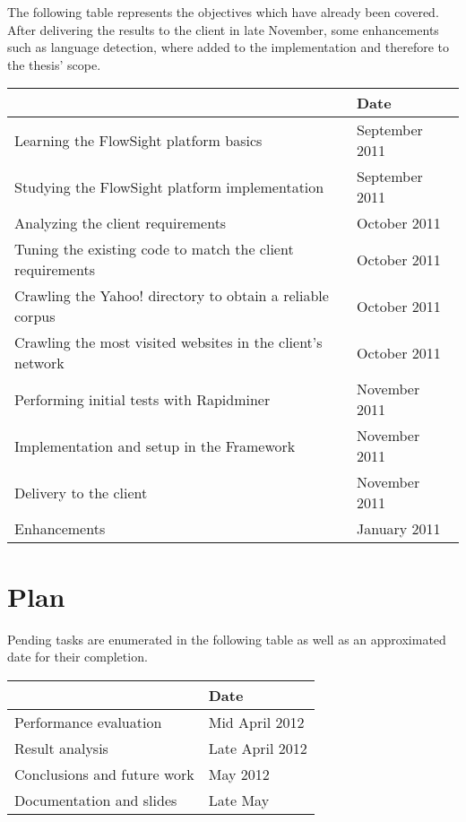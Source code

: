 \documentclass[12pt, a4paper , titlepage]{report}
\begin{document}
The following table represents the objectives which have already been covered.\\ 
After delivering the results to the client in late November, some enhancements such as language detection, where added to the implementation and therefore to the thesis' scope.

\begin{center}  
    \begin{tabular}{ | p{10cm} | l |}
    \hline
    \rowcolor{lightgray}{\bf Objective} & {\bf Date} \\ \hline
    Learning the FlowSight platform basics & September 2011 \\ \hline 
    Studying the FlowSight platform implementation  & September 2011 \\ \hline
    Analyzing the client requirements & October 2011 \\ \hline
    Tuning the existing code to match the client requirements & October 2011 \\ \hline
    Crawling the Yahoo! directory to obtain a reliable corpus & October 2011\\ \hline
    Crawling the most visited websites in the client's network & October 2011\\ \hline
    Performing initial tests with Rapidminer & November 2011 \\ \hline
    Implementation and setup in the Framework & November 2011\\ \hline
    Delivery to the client & November 2011\\ \hline
    Enhancements & January 2011\\ \hline
    \end{tabular}
\end{center}


\chapter{Plan}
Pending tasks are enumerated in the following table as well as an approximated date for their completion.
\begin{center}
    \begin{tabular}{ | p{10cm} | l |}
    \hline
    \rowcolor{lightgray}{\bf Objective} & {\bf Date} \\ \hline
    Performance evaluation & Mid April 2012\\ \hline
    Result analysis & Late April 2012\\ \hline
    Conclusions and future work & May 2012\\ \hline
    Documentation and slides & Late May\\ \hline
    \end{tabular}
\end{center}
 
\end{document}
